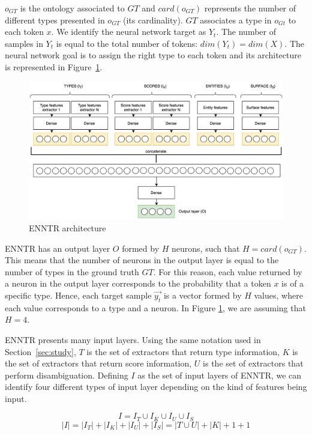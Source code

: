 \documentclass{llncs}
\newcommand{\secref}[1]{\mbox{Section~\ref{#1}}}
\begin{document}
$o_{GT}$ is the ontology associated to $GT$ and $card(o_{GT})$ represents the number of different types presented in $o_{GT}$ (its cardinality). $GT$ associates a type in $o_{Gt}$ to each token $x$. We identify the neural network target as $Y_t$. The number of samples in $Y_t$ is equal to the total number of tokens: $dim(Y_t)=dim(X)$. The neural network goal is to assign the right type to each token and its architecture is represented in Figure~\ref{fig:architecture_type_recognition}. 

\begin{figure}
	\centering
    	\includegraphics[scale=0.2]{architecture_type_recognition.png}
 	\caption{ENNTR architecture}
 	\label{fig:architecture_type_recognition}
\end{figure}

ENNTR has an output layer $O$ formed by $H$ neurons, such that $H=card(o_{GT})$. This means that the number of neurons in the output layer is equal to the number of types in the ground truth $GT$. For this reason, each value returned by a neuron in the output layer corresponds to the probability that a token $x$ is of a specific type. Hence, each target sample $\vec{y_t}$ is a vector formed by $H$ values, where each value corresponds to a type and a neuron. In Figure \ref{fig:architecture_type_recognition}, we are assuming that $H = 4$.

ENNTR presents many input layers. Using the same notation used in \secref{sec:study}, $T$ is the set of extractors that return type information, $K$ is the set of extractors that return score information, $U$ is the set of extractors that perform disambiguation. Defining $I$ as the set of input layers of ENNTR, we can identify four different types of input layer depending on the kind of features being input.

$$I = I_T \cup I_K \cup I_U \cup I_S$$
$$\left\vert{I}\right\vert= \left\vert{I_T}\right\vert + \left\vert{I_K}\right\vert + \left\vert{I_U}\right\vert + \left\vert{I_S}\right\vert  = \left\vert{T \cup U}\right\vert + \left\vert{K}\right\vert + 1 + 1$$
\end{document}
